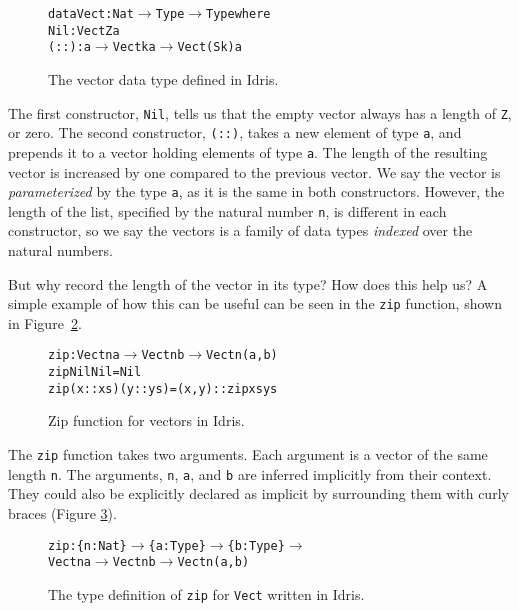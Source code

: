 \begin{figure}
\begin{alltt}
data Vect : Nat \(\to\) Type \(\to\) Type where
  Nil  : Vect Z a
  (::) : a \(\to\) Vect k a \(\to\) Vect (S k) a
\end{alltt}
\caption{The vector data type defined in Idris.}
\label{fig:vect}
\end{figure}

The first constructor, \texttt{Nil}, tells us that the empty vector always has a length of \texttt{Z}, or zero. The second constructor, \texttt{(::)}, takes a new element of type \texttt{a}, and prepends it to a vector holding elements of type \texttt{a}. The length of the resulting vector is increased by one compared to the previous vector. We say the vector is \emph{parameterized} by the type \texttt{a}, as it is the same in both constructors. However, the length of the list, specified by the natural number \texttt{n}, is different in each constructor, so we say the vectors is a family of data types \emph{indexed} over the natural numbers.

But why record the length of the vector in its type? How does this help us? A simple example of how this can be useful can be seen in the \texttt{zip} function, shown in Figure~\ref{fig:zip}.

\begin{figure}
\begin{alltt}
zip : Vect n a \(\to\) Vect n b \(\to\) Vect n (a, b)
zip Nil       Nil       = Nil
zip (x :: xs) (y :: ys) = (x, y) :: zip xs ys
\end{alltt}
\caption{Zip function for vectors in Idris.}
\label{fig:zip}
\end{figure}

The \texttt{zip} function takes two arguments. Each argument is a vector of the same length \texttt{n}. The arguments, \texttt{n}, \texttt{a}, and \texttt{b} are inferred implicitly from their context. They could also be explicitly declared as implicit by surrounding them with curly braces
(Figure \ref{fig:zip_implicit_args}).

\begin{figure}
	\begin{alltt}
	zip : \{n: Nat\} \(\to\) \{a: Type\} \(\to\) \{b: Type\} \(\to\) 
	      Vect n a \(\to\) Vect n b \(\to\) Vect n (a, b)
	\end{alltt}
\caption{The type definition of \texttt{zip} for \texttt{Vect} written in Idris.}
\label{fig:zip_implicit_args}
\end{figure}

